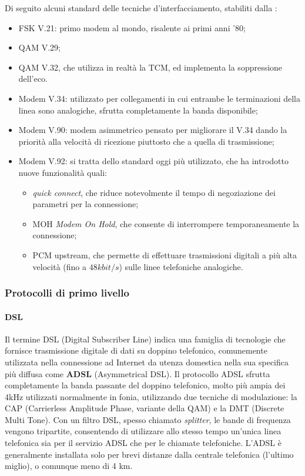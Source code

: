 \documentclass[a4paper,11pt]{article}
\def\subsub#1{\subsubsection{#1}\label{#1}}
\def\para#1{\paragraph{#1}\label{#1}}
\def\vedi#1{\nameref{#1}}
\begin{document}
Di seguito alcuni standard delle tecniche d'interfacciamento,  stabiliti dalla \vedi{CCITT}:
\begin{itemize} %
\item FSK V.21: primo modem al mondo, risalente ai primi anni '80;
\item QAM V.29;
\item QAM V.32, che utilizza in realtà la TCM, ed implementa la soppressione dell'eco. %
\item Modem V.34: utilizzato per collegamenti in cui entrambe le terminazioni della linea sono analogiche, sfrutta completamente la banda disponibile;
\item Modem V.90: modem asimmetrico pensato per migliorare il V.34 dando la priorità alla velocità di ricezione piuttosto che a quella di trasmissione;
\item Modem V.92: si tratta dello standard oggi più utilizzato, che ha introdotto nuove funzionalità quali:
\begin{itemize}
\item \textit{quick connect}, che riduce notevolmente il tempo di negoziazione dei parametri per la connessione;
\item MOH \textit{Modem On Hold}, che consente di interrompere temporaneamente la connessione;
\item PCM upstream, che permette di effettuare trasmissioni digitali a più alta velocità (fino a $48 kbit/s$) sulle linee telefoniche analogiche.
\end{itemize}
\end{itemize}
\subsub{Protocolli di primo livello}
\para{DSL}
Il termine DSL (Digital Subscriber Line) indica una famiglia di tecnologie che fornisce trasmissione digitale di dati su doppino telefonico, comunemente utilizzata nella connessione ad Internet da utenza domestica nella sua specifica più diffusa come \textbf{ADSL} (Asymmetrical DSL). Il protocollo ADSL sfrutta completamente la banda passante del doppino telefonico, molto più ampia dei 4kHz utilizzati normalmente in fonia, utilizzando due tecniche di modulazione: la CAP (Carrierless Amplitude Phase, variante della QAM) e la DMT (Discrete Multi Tone).
Con un filtro DSL, spesso chiamato \textit{splitter}, le bande di frequenza vengono tripartite, consentendo di utilizzare  allo stesso tempo un'unica linea telefonica sia per il servizio ADSL che per le chiamate telefoniche. L'ADSL è generalmente installata solo per brevi distanze dalla centrale telefonica (l'ultimo miglio), o comunque meno di 4 km.
\end{document}
